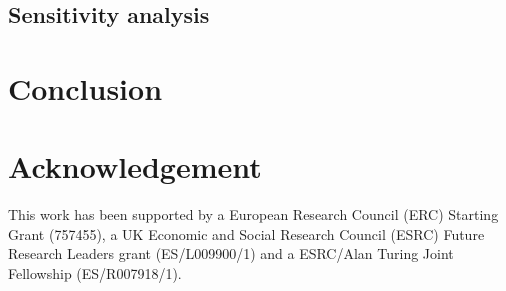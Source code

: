 \documentclass[11pt]{article}
\providecommand{\DIFaddbegin}{} %
\providecommand{\DIFaddend}{} %
\newcommand{\DIFaddincludegraphics}[2][]{{\color{blue}\fbox{\DIFOincludegraphics[#1]{#2}}}} %
\DeclareRobustCommand{\DIFaddbegin}{\DIFOaddbegin \let\includegraphics\DIFaddincludegraphics} %
\DeclareRobustCommand{\DIFaddend}{\DIFOaddend \let\includegraphics\DIFOincludegraphics} %
\begin{document}
\subsection{Sensitivity analysis}



  
    
    

\section{Conclusion\DIFaddbegin \label{s:conclusion}\DIFaddend }


\section{Acknowledgement}
This work has been supported by a European Research Council (ERC) Starting Grant (757455), a UK Economic and Social Research Council (ESRC) Future Research Leaders grant (ES/L009900/1) and a ESRC/Alan Turing Joint Fellowship (ES/R007918/1).
\end{document}

